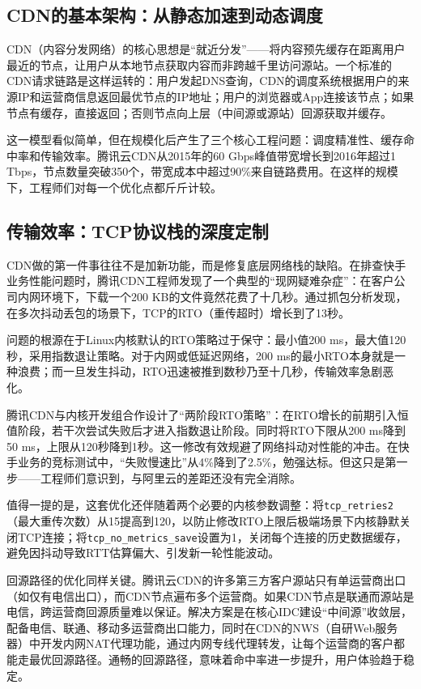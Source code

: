 \subsection{CDN的基本架构：从静态加速到动态调度}

CDN（内容分发网络）的核心思想是``就近分发''——将内容预先缓存在距离用户最近的节点，让用户从本地节点获取内容而非跨越千里访问源站。一个标准的CDN请求链路是这样运转的：用户发起DNS查询，CDN的调度系统根据用户的来源IP和运营商信息返回最优节点的IP地址；用户的浏览器或App连接该节点；如果节点有缓存，直接返回；否则节点向上层（中间源或源站）回源获取并缓存。

这一模型看似简单，但在规模化后产生了三个核心工程问题：调度精准性、缓存命中率和传输效率。腾讯云CDN从2015年的60 Gbps峰值带宽增长到2016年超过1 Tbps，节点数量突破350个，带宽成本中超过90\%来自链路费用。在这样的规模下，工程师们对每一个优化点都斤斤计较。

\subsection{传输效率：TCP协议栈的深度定制}

CDN做的第一件事往往不是加新功能，而是修复底层网络栈的缺陷。在排查快手业务性能问题时，腾讯CDN工程师发现了一个典型的``现网疑难杂症''：在客户公司内网环境下，下载一个200 KB的文件竟然花费了十几秒。通过抓包分析发现，在多次抖动丢包的场景下，TCP的RTO（重传超时）增长到了13秒。

问题的根源在于Linux内核默认的RTO策略过于保守：最小值200 ms，最大值120秒，采用指数退让策略。对于内网或低延迟网络，200 ms的最小RTO本身就是一种浪费；而一旦发生抖动，RTO迅速被推到数秒乃至十几秒，传输效率急剧恶化。

腾讯CDN与内核开发组合作设计了``两阶段RTO策略''：在RTO增长的前期引入恒值阶段，若干次尝试失败后才进入指数退让阶段。同时将RTO下限从200 ms降到50 ms，上限从120秒降到1秒。这一修改有效规避了网络抖动对性能的冲击。在快手业务的竞标测试中，``失败慢速比''从4\%降到了2.5\%，勉强达标。但这只是第一步——工程师们意识到，与阿里云的差距还没有完全消除。

值得一提的是，这套优化还伴随着两个必要的内核参数调整：将\texttt{tcp\_retries2}（最大重传次数）从15提高到120，以防止修改RTO上限后极端场景下内核静默关闭TCP连接；将\texttt{tcp\_no\_metrics\_save}设置为1，关闭每个连接的历史数据缓存，避免因抖动导致RTT估算偏大、引发新一轮性能波动。

回源路径的优化同样关键。腾讯云CDN的许多第三方客户源站只有单运营商出口（如仅有电信出口），而CDN节点遍布多个运营商。如果CDN节点是联通而源站是电信，跨运营商回源质量难以保证。解决方案是在核心IDC建设``中间源''收敛层，配备电信、联通、移动多运营商出口能力，同时在CDN的NWS（自研Web服务器）中开发内网NAT代理功能，通过内网专线代理转发，让每个运营商的客户都能走最优回源路径。通畅的回源路径，意味着命中率进一步提升，用户体验趋于稳定。

